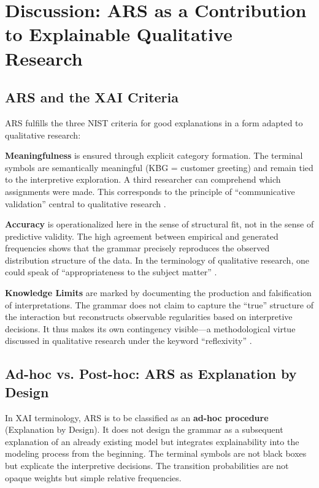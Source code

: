 \documentclass[
  12pt,
  a4paper,
  oneside,
  titlepage
]{article}
\begin{document}
\section{Discussion: ARS as a Contribution to Explainable Qualitative Research}

\subsection{ARS and the XAI Criteria}

ARS fulfills the three NIST criteria for good explanations in a form adapted to 
qualitative research:

\textbf{Meaningfulness} is ensured through explicit category formation. The terminal 
symbols are semantically meaningful (KBG = customer greeting) and remain tied to the 
interpretive exploration. A third researcher can comprehend which assignments were 
made. This corresponds to the principle of \enquote{communicative validation} central 
to qualitative research \citep[ p.~328]{Flick2019}.

\textbf{Accuracy} is operationalized here in the sense of structural fit, not in the 
sense of predictive validity. The high agreement between empirical and generated 
frequencies shows that the grammar precisely reproduces the observed distribution 
structure of the data. In the terminology of qualitative research, one could speak 
of \enquote{appropriateness to the subject matter} \citep[ p.~34]{Przyborski2021}.

\textbf{Knowledge Limits} are marked by documenting the production and falsification 
of interpretations. The grammar does not claim to capture the \enquote{true} structure 
of the interaction but reconstructs observable regularities based on interpretive 
decisions. It thus makes its own contingency visible—a methodological virtue discussed 
in qualitative research under the keyword \enquote{reflexivity} \citep[ p.~129]{Flick2019}.

\subsection{Ad-hoc vs. Post-hoc: ARS as Explanation by Design}

In XAI terminology, ARS is to be classified as an \textbf{ad-hoc procedure} 
(Explanation by Design). It does not design the grammar as a subsequent explanation 
of an already existing model but integrates explainability into the modeling process 
from the beginning. The terminal symbols are not black boxes but explicate the 
interpretive decisions. The transition probabilities are not opaque weights but 
simple relative frequencies.
\end{document}
